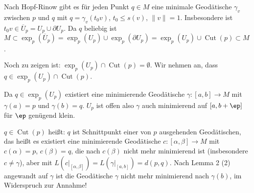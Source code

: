 \documentclass[a4paper,twoside,DIV15,BCOR12mm]{scrbook}
\DeclareMathOperator{\cut}{Cut}
\begin{document}
\begin{beweis}
Nach Hopf-Rinow gibt es für jeden Punkt $q\in M$ eine minimale Geodätische $\gamma_v$ zwischen $p$ und $q$ mit $q=\gamma_v(t_0 v)$, $t_0\le s(v)$, $\|v\|=1$. Insbesondere ist $t_0 v \in \overline U_p = U_p \cup \partial U_p$. Da $q$ beliebig ist $M \subset \exp_p(\overline U_p) = \exp_p(U_p) \cup \exp_p(\partial U_p) = \exp_p(U_p) \cup \cut(p) \subset M$.

Noch zu zeigen ist: $\exp_p(U_p) \cap \cut(p) = \emptyset$. Wir nehmen an, dass $q \in \exp_p(U_p) \cap \cut(p)$.

Da $q\in \exp_p(U_p)$ existiert eine minimierende Geodätische $\gamma:[a,b] \to M$ mit $\gamma(a) = p$ und $\gamma(b) = q$. $U_p$ ist offen also $\gamma$ auch minimierend auf $[a,b+\ep]$ für $\ep$ genügend klein.

$q\in \cut(p)$ heißt: $q$ ist Schnittpunkt einer von $p$ ausgehenden Geodätischen, das heißt es existiert eine minimierende Geodätische $c:[\alpha,\beta] \to M$ mit $c(\alpha)=p$, $c(\beta)=q$, die nach $c(\beta)$ nicht mehr minimierend ist (insbesondere $c\ne \gamma$), aber mit $L(c|_{[\alpha,\beta]}) = L(\gamma|_{[a,b]}) = d(p,q)$. Nach Lemma 2 (2) angewandt auf $\gamma$ ist die Geodätische $\gamma$ nicht mehr minimierend nach $\gamma(b)$, im Widerspruch zur Annahme!
\end{beweis}
\end{document}
